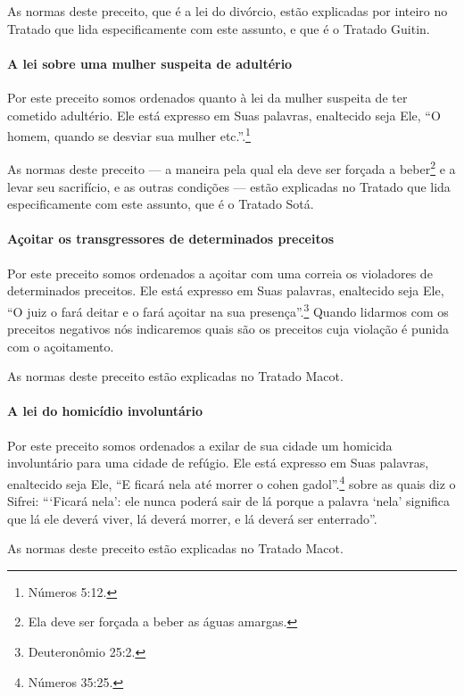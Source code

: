 \begin{multicols}{2}
As normas deste preceito, que é a lei do divórcio, estão explicadas por
inteiro no Tratado que lida especificamente com este assunto, e que é o
Tratado Guitin\starr.

\paragraph{A lei sobre uma mulher suspeita de adultério}

Por este preceito somos ordenados quanto à lei da mulher suspeita de ter
cometido adultério. Ele está expresso em Suas palavras, enaltecido seja Ele,
``O homem, quando se desviar sua mulher etc.''.\footnote{Números 5:12.}

As normas deste preceito --- a maneira pela qual ela deve ser forçada a
beber\footnote{Ela deve ser forçada a beber as águas amargas.} e a levar seu sacrifício, e as outras
condições --- estão explicadas no Tratado que lida especificamente com
este assunto, que é o Tratado Sotá\starr.

\paragraph{Açoitar os transgressores de determinados preceitos}

Por este preceito somos ordenados a açoitar com uma correia os
violadores de determinados preceitos. Ele está expresso em Suas
palavras, enaltecido seja Ele, ``O juiz o fará deitar e o fará açoitar
na sua presença''.\footnote{Deuteronômio 25:2.} Quando lidarmos com os preceitos
negativos nós indicaremos quais são os preceitos cuja violação é punida
com o açoitamento.

As normas deste preceito estão explicadas no Tratado Macot\starr.

\paragraph{A lei do homicídio involuntário}

Por este preceito somos ordenados a exilar de sua cidade um homicida
involuntário para uma cidade de refúgio. Ele está expresso em Suas
palavras, enaltecido seja Ele, ``E ficará nela até morrer o cohen
gadol\starr{}''.\footnote{Números 35:25.} sobre as quais diz o Sifrei\starr: ```Ficará nela':
ele nunca poderá sair de lá porque a palavra `nela' significa que lá ele
deverá viver, lá deverá morrer, e lá deverá ser enterrado''.

As normas deste preceito estão explicadas no Tratado Macot\starr.


\end{multicols}
